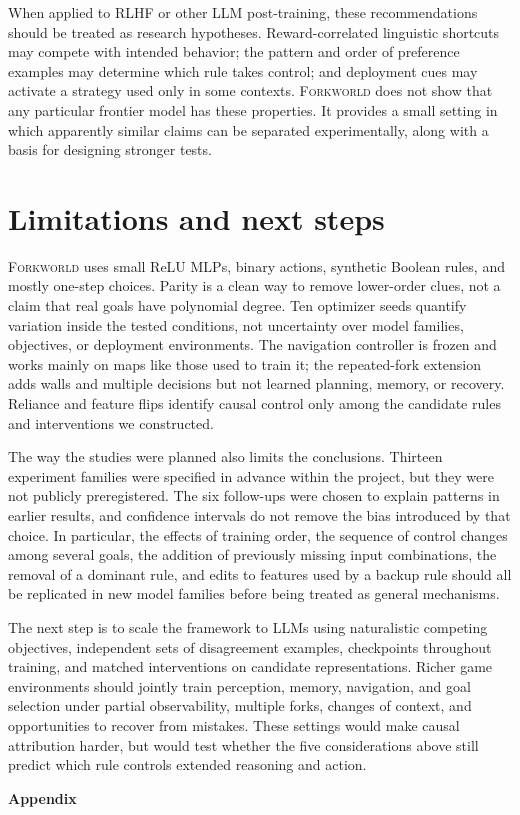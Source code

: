 \documentclass[11pt,a4paper]{article}
\newcommand{\Forkworld}{\textsc{Forkworld}}
\begin{document}
When applied to RLHF or other LLM post-training, these recommendations should be treated as research hypotheses. Reward-correlated linguistic shortcuts may compete with intended behavior; the pattern and order of preference examples may determine which rule takes control; and deployment cues may activate a strategy used only in some contexts. \Forkworld{} does not show that any particular frontier model has these properties. It provides a small setting in which apparently similar claims can be separated experimentally, along with a basis for designing stronger tests.

\section*{Limitations and next steps}

\Forkworld{} uses small ReLU MLPs, binary actions, synthetic Boolean rules, and mostly one-step choices. Parity is a clean way to remove lower-order clues, not a claim that real goals have polynomial degree. Ten optimizer seeds quantify variation inside the tested conditions, not uncertainty over model families, objectives, or deployment environments. The navigation controller is frozen and works mainly on maps like those used to train it; the repeated-fork extension adds walls and multiple decisions but not learned planning, memory, or recovery. Reliance and feature flips identify causal control only among the candidate rules and interventions we constructed.

The way the studies were planned also limits the conclusions. Thirteen experiment families were specified in advance within the project, but they were not publicly preregistered. The six follow-ups were chosen to explain patterns in earlier results, and confidence intervals do not remove the bias introduced by that choice. In particular, the effects of training order, the sequence of control changes among several goals, the addition of previously missing input combinations, the removal of a dominant rule, and edits to features used by a backup rule should all be replicated in new model families before being treated as general mechanisms.

The next step is to scale the framework to LLMs using naturalistic competing objectives, independent sets of disagreement examples, checkpoints throughout training, and matched interventions on candidate representations. Richer game environments should jointly train perception, memory, navigation, and goal selection under partial observability, multiple forks, changes of context, and opportunities to recover from mistakes. These settings would make causal attribution harder, but would test whether the five considerations above still predict which rule controls extended reasoning and action.

\clearpage
\appendix
\begin{center}
  {\LARGE\bfseries Appendix}
\end{center}
\vspace{1em}


\clearpage
\begingroup
\raggedright

\endgroup
\end{document}
